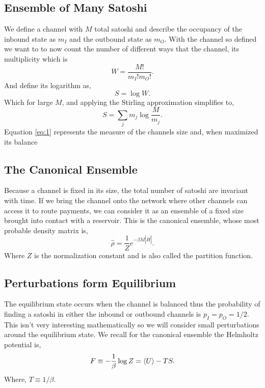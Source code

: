 \documentclass[review,12pt]{elsarticle}
\begin{document}
\subsection{Ensemble of Many Satoshi}
We define a channel with $M$ total satoshi and describe the occupancy of the inbound state as $m_I$ and the outbound state as $m_O$.
With the channel so defined we want to to now count the number of different ways that the channel, its multiplicity which is
\begin{equation}
  W = \frac{M!}{m_I!m_O!}. \nonumber
\end{equation}
And define its logarithm as,
\begin{equation}
  S = \log W. \nonumber
\end{equation}
Which for large $M$, and applying the Stirling approximation simplifies to,
\begin{equation}
  S = \sum_j m_j \log\frac{M}{m_j}.\label{eq:1}
\end{equation}
Equation \ref{eq:1} represents the measure of the channels size and, when maximized its balance

\subsection{The Canonical Ensemble}
Because a channel is fixed in its size, the total number of satoshi are invariant with time.
If we bring the channel onto the network where other channels can access it to route payments, we can consider it as an ensemble of a fixed size brought into contact with a reservoir.
This is the canonical ensemble, whose most probable density matrix is,
\begin{equation}
  \hat{\rho} = \frac{1}{Z}e^{-\beta M \left\lvert \hat{H} \right\rvert}. \nonumber
\end{equation}
Where $Z$ is the normalization constant and is also called the partition function.

\subsection{Perturbations form Equilibrium}
The equilibrium state occurs when the channel is balanced thus the probability of finding a satoshi in either the inbound or outbound channels is $p_I=p_O=1/2$.
This isn't very interesting mathematically so we will consider small perturbations around the equilibrium state.
We recall for the canonical ensemble the Helmholtz potential is,
\begin{equation}
  F \equiv - \frac{1}{\beta}\log Z = \Braket{U} - TS. \nonumber
\end{equation}
Where, $T \equiv 1/\beta$.
\end{document}
